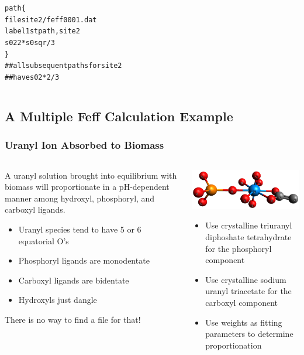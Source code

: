 \documentclass[10pt, xcolor=x11names, compress]{beamer}
\begin{document}
\begin{frame}[fragile]
\begin{columns}
\begin{column}{0.5\linewidth}
\begin{alltt}
  {\color{Purple4}path} \{
     {\color{Gold4}file}    site2/feff0001.dat
     {\color{Gold4}label}   1st path, site 2
     {\color{Gold4}s02}     2 * s0sqr / 3
   \}
  {\color{Blue4}## all subsequent paths for site 2
  ## have} {\color{Gold4}s02}{\color{Blue4} * 2/3}
      \end{alltt}      
    \end{column}
  \end{columns}
\end{frame}

\subsection[Example]{A Multiple Feff Calculation Example}
\begin{frame}
  \frametitle{Uranyl Ion Absorbed to Biomass}

  \begin{columns}[T]
    \begin{column}{0.5\linewidth}
      A uranyl solution brought into equilibrium with biomass will
      proportionate in a pH-dependent manner among hydroxyl,
      phosphoryl, and carboxyl ligands.
      \begin{itemize}
      \item Uranyl species tend to have 5 or 6 equatorial O's
      \item Phosphoryl ligands are monodentate
      \item Carboxyl ligands are bidentate
      \item Hydroxyls just dangle
      \end{itemize}
      \begin{alertblock}{}
        There is no way to find a  file for that!
      \end{alertblock}
    \end{column}
    \begin{column}{0.5\linewidth}
      \quad\includegraphics[width=0.8\linewidth]{mfc/uranyl.png}
      \begin{itemize}
      \item Use crystalline triuranyl diphoshate tetrahydrate for the
        phosphoryl component
      \item Use crystalline sodium uranyl triacetate for the carboxyl
        component 
      \item Use weights as fitting parameters to determine proportionation
      \end{itemize}
    \end{column}
  \end{columns}



\end{frame}
\end{document}
